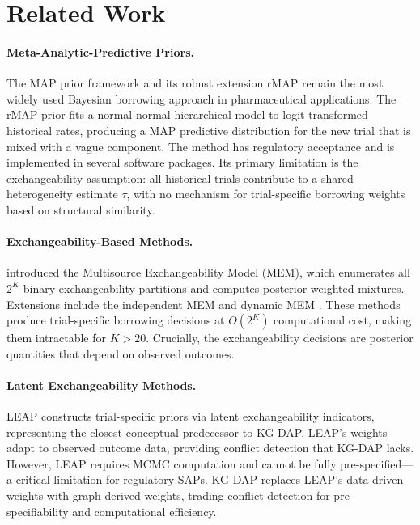 \documentclass[12pt]{article}
\begin{document}
\section{Related Work}
\label{sec:related}

\paragraph{Meta-Analytic-Predictive Priors.}
The MAP prior framework \citep{neuenschwander2010summarizing} and its robust extension rMAP \citep{schmidli2014robust} remain the most widely used Bayesian borrowing approach in pharmaceutical applications. The rMAP prior fits a normal-normal hierarchical model to logit-transformed historical rates, producing a MAP predictive distribution for the new trial that is mixed with a vague component. The method has regulatory acceptance \citep{fda2019adaptive} and is implemented in several software packages. Its primary limitation is the exchangeability assumption: all historical trials contribute to a shared heterogeneity estimate $\tau$, with no mechanism for trial-specific borrowing weights based on structural similarity.

\paragraph{Exchangeability-Based Methods.}
\citet{kaizer2018bayesian} introduced the Multisource Exchangeability Model (MEM), which enumerates all $2^K$ binary exchangeability partitions and computes posterior-weighted mixtures. Extensions include the independent MEM \citep[iMEM;][]{kaizer2021bayesian} and dynamic MEM \citep[dMEM;][]{ji2022dynamic}. These methods produce trial-specific borrowing decisions at $O(2^K)$ computational cost, making them intractable for $K > 20$. Crucially, the exchangeability decisions are posterior quantities that depend on observed outcomes.

\paragraph{Latent Exchangeability Methods.}
LEAP \citep{alt2024leap} constructs trial-specific priors via latent exchangeability indicators, representing the closest conceptual predecessor to KG-DAP. LEAP's weights adapt to observed outcome data, providing conflict detection that KG-DAP lacks. However, LEAP requires MCMC computation and cannot be fully pre-specified---a critical limitation for regulatory SAPs. KG-DAP replaces LEAP's data-driven weights with graph-derived weights, trading conflict detection for pre-specifiability and computational efficiency.
\end{document}
